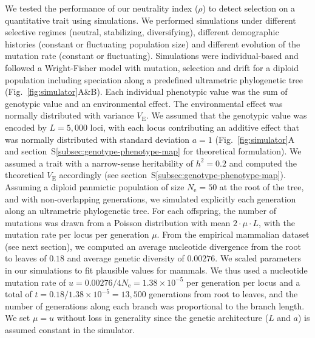 \documentclass{article}
\newcommand{\Multiply}{\cdot}
\newcommand{\Ne}{N_{\text{e}}}
\newcommand{\Time}{t}
\newcommand{\Heritability}{h^2}
\newcommand{\MutationRatePheno}{\mu}
\newcommand{\MutationRateNuc}{u}
\newcommand{\NbrLoci}{L}
\newcommand{\VarEnv}{V_{\mathrm{E}}}
\newcommand{\NI}{\rho}
\begin{document}
We tested the performance of our neutrality index ($\NI$) to detect selection on a quantitative trait using simulations.
We performed simulations under different selective regimes (neutral, stabilizing, diversifying), different demographic histories (constant or fluctuating population size) and different evolution of the mutation rate (constant or fluctuating).
Simulations were individual-based and followed a Wright-Fisher model with mutation, selection and drift for a diploid population including speciation along a predefined ultrametric phylogenetic tree (Fig.~\ref{fig:simulator}A\&B).
Each individual phenotypic value was the sum of genotypic value and an environmental effect.
The environmental effect was normally distributed with variance $\VarEnv$.
We assumed that the genotypic value was encoded by $\NbrLoci=5,000$ loci, with each locus contributing an additive effect that was normally distributed with standard deviation $a=1$ (Fig.~\ref{fig:simulator}A and section~S\ref{subsec:genotype-phenotype-map} for theoretical formulation).
We assumed a trait with a narrow-sense heritability of $\Heritability=0.2$ and computed the theoretical $\VarEnv$ accordingly (see section~S\ref{subsec:genotype-phenotype-map}).
Assuming a diploid panmictic population of size $\Ne=50$ at the root of the tree, and with non-overlapping generations, we simulated explicitly each generation along an ultrametric phylogenetic tree.
For each offspring, the number of mutations was drawn from a Poisson distribution with mean $2 \Multiply \MutationRatePheno \Multiply \NbrLoci $, with the mutation rate per locus per generation $\MutationRatePheno$.
From the empirical mammalian dataset (see next section), we computed an average nucleotide divergence from the root to leaves of $0.18$ and average genetic diversity of $0.00276$.
We scaled parameters in our simulations to fit plausible values for mammals.
We thus used a nucleotide mutation rate of $\MutationRateNuc=0.00276 / 4 \Ne = 1.38 \times 10^{-5}$ per generation per locus and a total of $\Time = 0.18 / 1.38 \times 10^{-5} = 13,500$ generations from root to leaves, and the number of generations along each branch was proportional to the branch length.
We set $\MutationRatePheno=\MutationRateNuc$ without loss in generality since the genetic architecture ($\NbrLoci$ and $a$) is assumed constant in the simulator.
\end{document}
